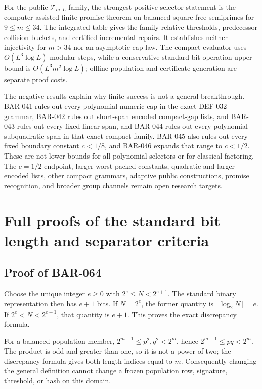 \documentclass[11pt]{article}
\begin{document}
For the public \(\mathcal T_{m,L}\) family, the strongest positive selector
statement is the computer-assisted finite promise theorem on balanced
square-free semiprimes for \(9\le m\le34\). The integrated table gives the
family-relative thresholds, predecessor collision buckets, and certified
incremental repairs. It establishes neither injectivity for \(m>34\) nor an
asymptotic cap law. The compact evaluator uses
\(O(L^3\log L)\) modular steps, while a conservative standard
bit-operation upper bound is \(O(L^3m^2\log L)\); offline population and
certificate generation are separate proof costs.

The negative results explain why finite success is not a general
breakthrough. BAR-041 rules out every polynomial numeric cap in the exact
DEF-032 grammar, BAR-042 rules out short-span encoded compact-gap lists, and
BAR-043 rules out every fixed linear span, and BAR-044 rules out every
polynomial subquadratic span in that exact compact family. BAR-045 also rules
out every fixed boundary constant \(c<1/8\), and BAR-046 expands that range
to \(c<1/2\). These are not lower
bounds for all polynomial selectors or for classical factoring. The
\(c=1/2\) endpoint, larger worst-packed constants, quadratic and larger encoded lists,
other compact grammars, adaptive public constructions, promise recognition,
and broader group channels remain open research targets.


\appendix

\section{Full proofs of the standard bit length and separator criteria}

\subsection{Proof of BAR-064}\label{proof:BAR-064}

Choose the unique integer \(e\ge0\) with
\(2^e\le N<2^{e+1}\). The standard binary representation then has
\(e+1\) bits. If \(N=2^e\), the former quantity is
\(\lceil\log_2N\rceil=e\). If \(2^e<N<2^{e+1}\), that quantity is \(e+1\).
This proves the exact discrepancy formula.

For a balanced population member,
\(2^{m-1}\le p^2,q^2<2^m\), hence
\(2^{m-1}\le pq<2^m\). The product is odd and greater than one, so it is not
a power of two; the discrepancy formula gives both length indices equal to
\(m\). Consequently changing the general definition cannot change a frozen
population row, signature, threshold, or hash on this domain.
\end{document}
